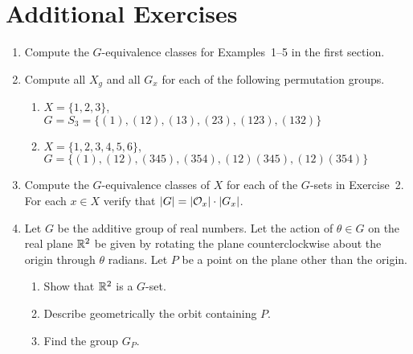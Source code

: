  
 
\section*{Additional Exercises}
\exrule
 
 
 
 
{\small
\begin{enumerate}
 
 
\bf\item\rm
Compute the $G$-equivalence classes for Examples~1--5 in the first
section. 
 
 
\bf\item\rm 
Compute all $X_g$ and all $G_x$ for each of the following permutation
groups. 
\begin{enumerate}
 
 \bf\item\rm
$X= \{1, 2, 3\}$, \\
$G=S_3=\{(1), (12), (13), (23), (123), (132)  \}$
 
 \bf\item\rm
$X = \{1, 2, 3, 4, 5, 6\}$, \\
$G = \{(1), (12), (345), (354), (12)(345), (12)(354)  \}$
 
\end{enumerate}
 
 
\bf\item\rm
Compute the $G$-equivalence classes of $X$ for each of the $G$-sets in
Exercise~2. For each $x \in X$ verify that $|G|=|{\cal O}_x| \cdot
|G_x|$.  
 
 
\bf\item\rm
Let $G$ be the additive group of real numbers. Let the action of
$\theta \in G$ on the real plane ${\Bbb R}^2$ be given by rotating the
plane counterclockwise about the origin through $\theta$ radians. Let
$P$ be a point on the plane other than the origin.
\begin{enumerate}
 
 \bf\item\rm
Show that ${\Bbb R}^2$ is a $G$-set.
 
 \bf\item\rm
Describe geometrically the orbit containing $P$.
 
 \bf\item\rm
Find the group $G_P$.
 
\end{enumerate}
 

\end{enumerate}}
